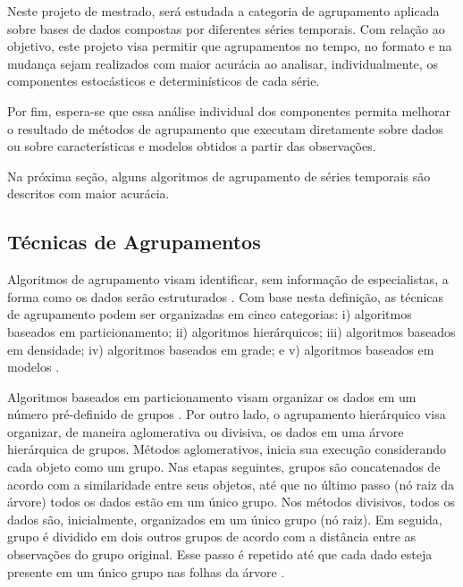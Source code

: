 Neste projeto de mestrado, será estudada a categoria de agrupamento aplicada sobre bases de dados compostas por diferentes séries temporais. Com relação ao objetivo, este projeto visa permitir que agrupamentos no tempo, no formato e na mudança sejam realizados com maior acurácia ao analisar, individualmente, os componentes estocásticos e determinísticos de cada série.

Por fim, espera-se que essa análise individual dos componentes permita melhorar o resultado de métodos de agrupamento que executam diretamente sobre dados ou sobre características e modelos obtidos a partir das observações.
 
Na próxima seção, alguns algoritmos de agrupamento de séries temporais são descritos com maior acurácia. 


\subsection{Técnicas de Agrupamentos}
 
Algoritmos de agrupamento visam identificar, sem informação de especialistas, a forma como os dados serão estruturados \cite{faceli2011inteligencia}. Com base nesta definição, as técnicas de agrupamento podem ser organizadas em cinco categorias: i) algoritmos baseados em particionamento; ii) algoritmos hierárquicos; iii) algoritmos baseados em densidade; iv) algoritmos baseados em grade; e v) algoritmos baseados em modelos \cite{Nguyen2015,Liao2005}.

Algoritmos baseados em particionamento visam organizar os dados em um número pré-definido de grupos \cite{Nguyen2015}. Por outro lado, o agrupamento hierárquico visa organizar, de maneira aglomerativa ou divisiva, os dados em uma árvore hierárquica de grupos. Métodos aglomerativos, inicia sua execução considerando cada objeto como um grupo. Nas etapas seguintes, grupos são concatenados de acordo com a similaridade entre seus objetos, até que no último passo (nó raiz da árvore) todos os dados estão em um único grupo. Nos métodos divisivos, todos os dados são, inicialmente, organizados em um único grupo (nó raiz). Em seguida, grupo é dividido em dois outros grupos de acordo com a distância entre as observações do grupo original. Esse passo é repetido até que cada dado esteja presente em um único grupo nas folhas da árvore \cite{Aghabozorgi2015, Liao2005,Nguyen2015}. 

